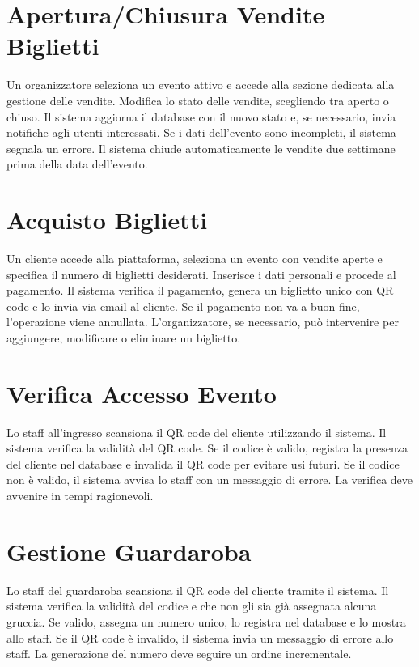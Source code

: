 \documentclass[a4paper,12pt]{article}
\begin{document}
\section{\textcolor{sectioncolor}{Apertura/Chiusura Vendite Biglietti}}
\textcolor{textcolor}{
Un organizzatore seleziona un evento attivo e accede alla sezione dedicata alla gestione delle vendite. Modifica lo stato delle vendite, scegliendo tra aperto o chiuso. Il sistema aggiorna il database con il nuovo stato e, se necessario, invia notifiche agli utenti interessati. Se i dati dell’evento sono incompleti, il sistema segnala un errore. Il sistema chiude automaticamente le vendite due settimane prima della data dell’evento.
}

\section{\textcolor{sectioncolor}{Acquisto Biglietti}}
\textcolor{textcolor}{
Un cliente accede alla piattaforma, seleziona un evento con vendite aperte e specifica il numero di biglietti desiderati. Inserisce i dati personali e procede al pagamento. Il sistema verifica il pagamento, genera un biglietto unico con QR code e lo invia via email al cliente. Se il pagamento non va a buon fine, l’operazione viene annullata. L’organizzatore, se necessario, può intervenire per aggiungere, modificare o eliminare un biglietto.
}

\section{\textcolor{sectioncolor}{Verifica Accesso Evento}}
\textcolor{textcolor}{
Lo staff all'ingresso scansiona il QR code del cliente utilizzando il sistema. Il sistema verifica la validità del QR code. Se il codice è valido, registra la presenza del cliente nel database e invalida il QR code per evitare usi futuri. Se il codice non è valido, il sistema avvisa lo staff con un messaggio di errore. La verifica deve avvenire in tempi ragionevoli.
}

\section{\textcolor{sectioncolor}{Gestione Guardaroba}}
\textcolor{textcolor}{
Lo staff del guardaroba scansiona il QR code del cliente tramite il sistema. Il sistema verifica la validità del codice e che non gli sia già assegnata alcuna gruccia. Se valido, assegna un numero unico, lo registra nel database e lo mostra allo staff. Se il QR code è invalido, il sistema invia un messaggio di errore allo staff. La generazione del numero deve seguire un ordine incrementale.
}
\end{document}
